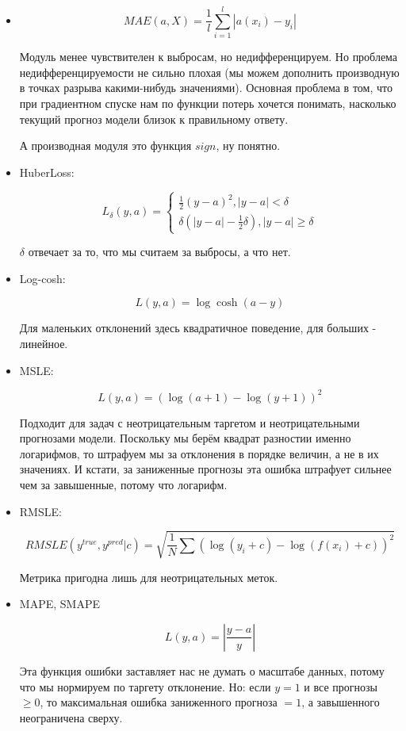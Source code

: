 \documentclass[12pt]{article}
\begin{document}
\begin{itemize}
\begin{itemize}
\item \[ MAE(a, X) = \frac{1}{l} \sum_{i=1}^l |a(x_i) - y_i | \]

Модуль менее чувствителен к выбросам, но недифференцируем.
Но проблема недифференцируемости не сильно плохая (мы можем дополнить производную в точках разрыва какими-нибудь значениями). Основная проблема в том, что при градиентном спуске нам по функции потерь хочется понимать, насколько текущий прогноз модели близок к правильному ответу.

А производная модуля это функция $sign$, ну понятно.

\item HuberLoss:

\[ L_\delta(y, a) = \begin{cases}
\frac{1}{2} (y-a)^2, |y-a| < \delta \\
\delta \left( |y-a| - \frac{1}{2} \delta \right), |y-a| \geq \delta
\end{cases} \]

$\delta$ отвечает за то, что мы считаем за выбросы, а что нет.

\item Log-cosh:

\[ L(y, a) = \log \cosh (a-y) \]

Для маленьких отклонений здесь квадратичное поведение, для больших - линейное.

\item MSLE:

\[ L(y, a) = (\log(a+1) - \log(y+1))^2 \]

Подходит для задач с неотрицательным таргетом и неотрицательными прогнозами модели. Поскольку мы берём квадрат разностии именно логарифмов, то штрафуем мы за отклонения в порядке величин, а не в их значениях. И кстати, за заниженные прогнозы эта ошибка штрафует сильнее чем за завышенные, потому что логарифм.

\item RMSLE:

\[ RMSLE(y^{true}, y^{pred} | c) =  \sqrt{ \frac{1}{N} \sum (\log(y_i + c) - \log(f(x_i)+c))^2} \]

Метрика пригодна лишь для неотрицательных меток.

\item MAPE, SMAPE

\[ L(y, a) = \left| \frac{y-a}{y} \right| \]

Эта функция ошибки заставляет нас не думать о масштабе данных, потому что мы нормируем по таргету отклонение. Но: если $y=1$ и все прогнозы $\geq 0$, то максимальная ошибка заниженного прогноза $=1$, а завышенного неограничена сверху.


\end{itemize}
\end{itemize}
\end{document}
